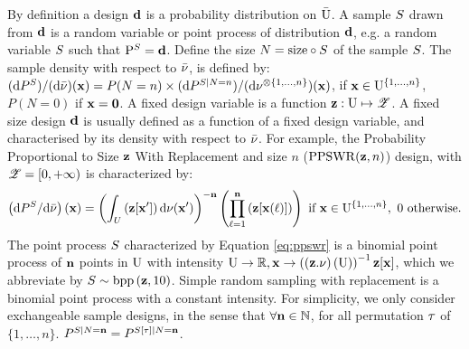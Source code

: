 By definition a design $\mathbf{d}$ is a probability distribution on $\bar{\mathrm{U}}$.
A sample $S$ drawn from $\mathbf{d}$ is a random variable or point process of distribution $\mathbf{d}$, e.g. a random variable $S$ such that $\mathrm{P}^S=\mathbf{d}$. 
Define the size $N=\mathrm{size}\circ S$ of the sample $S$. The sample density with respect to $\bar{\nu}$, is defined by:
$(\mathrm{d} P^S)/(\mathrm{d}\bar{\nu})(\mathbf{x})=P(N=n)\times(\mathrm{d} P^{S\mid N=n})/(\mathrm{d}\nu^{\otimes\{1,\ldots,n\}})(\mathbf{x})$, if $\mathbf{x}\in\mathrm{U}^{\{1,\ldots,n\}}$, $P(N=0)$ if $\mathbf{x}=\mathbf{0}$. 
A fixed design variable is a function $\mathbf{z}:\mathrm{U}\mapsto \mathscr{Z}$.
A fixed size design $\mathbf{d}$ is usually defined as a function of a fixed design variable, and characterised by its density with respect to $\bar{\nu}$. For example, 
the Probability Proportional to Size $\mathbf{z}$ With Replacement and size $n$ ($\mathrm{PPSWR}(\mathbf{z},n)$) design, with $\mathscr{Z}=[0,+\infty)$ is characterized by:  
\begin{equation}\label{eq:ppswr}\left(\mathrm{d} P^{S}/\mathrm{d}\bar{\nu}\right)(\mathbf{x})=\left(\int_U \left(\mathbf{z}[\mathbf{x}']\right)\mathrm{d}\nu (\mathbf{x}')\right)^{-\mathbf{n}}
\left(\prod_{\ell=1}^{\mathbf{n}}\left(\mathbf{z}[\mathbf{x}(\ell)]\right)\right)\text{ if }\mathbf{x}\in\mathrm{U}^{\{1,\ldots,n\}},~0\text{ otherwise.}
\end{equation}
The point process $S$ characterized by Equation \eqref{eq:ppswr} is a binomial point process of $\mathbf{n}$ points in $\mathrm{U}$ with intensity $\mathrm{U}\to\mathbb{R}, \mathbf{x}\to\left(\left(\mathbf{z}.\nu\right)\left(\mathrm{U}\right)\right)^{-1}\mathbf{z}[\mathbf{x}]$, which we abbreviate by $S\sim\mathrm{bpp}\left(\mathbf{z},10\right)$. Simple random sampling with replacement is a binomial point process with a constant intensity.  For simplicity, we only consider exchangeable sample designs, in the sense that $\forall \mathbf{n}\in\mathbb{N}$, for all permutation $\tau$ of $\{1,\ldots,n\}$. $P^{S\mid N=\mathbf{n}}=P^{S[\tau]\mid N=\mathbf{n}}$. %
